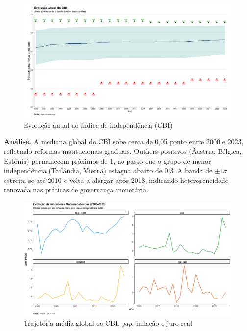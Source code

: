 \documentclass[a4paper,12pt]{article}[abnt2]
\begin{document}
\begin{figure}[H]
    \centering
    \caption{Evolução anual do índice de independência (CBI)}
    \label{fig:cbi_trend}
    \includegraphics[width=.85\linewidth]{Imagens/an1i5.png}
\end{figure}

\begin{flushleft}\small
\textbf{Análise.}
A mediana global do CBI sobe cerca de 0,05 ponto entre 2000 e 2023, refletindo reformas institucionais graduais.  
Outliers positivos (Áustria, Bélgica, Estónia) permanecem próximos de 1, ao passo que o grupo de menor independência (Tailândia, Vietnã) estagna abaixo de 0,3.  
A banda de \(\pm1\sigma\) estreita‑se até 2010 e volta a alargar após 2018, indicando heterogeneidade renovada nas práticas de governança monetária.
\end{flushleft}

\begin{figure}[H]
    \centering
    \caption{Trajetória média global de CBI, \textit{gap}, inflação e juro real}
    \label{fig:series_painel}
    \includegraphics[width=.85\linewidth]{Imagens/an1i6.png}
\end{figure}
\end{document}
